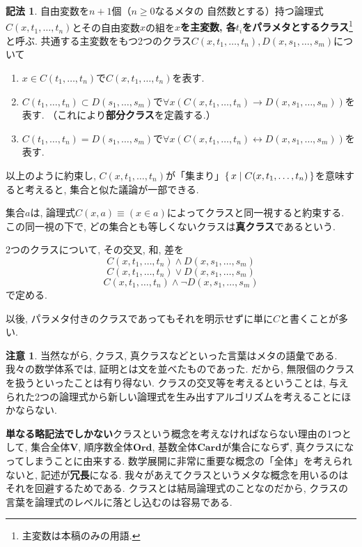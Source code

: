 \documentclass[a4paper, twoside]{bxjsarticle}
\theoremstyle{definition}
\newtheorem{rem}[thm]{注意}
\newtheorem{notation}[thm]{記法}
\begin{document}
        \begin{notation}
            自由変数を$n+1$個（$n\geq 0$なるメタの
            自然数とする）持つ論理式$C(x, t_1, \dots, t_n)$とその自由変数$x$の組を\textbf{$x$を主変数, 各$t_i$をパラメタとするクラス}\footnote{主変数は本稿のみの用語.}と呼ぶ.  共通する主変数をもつ2つのクラス$C(x, t_1, \dots, t_n), D(x, s_1, \dots, s_m)$について
            \begin{enumerate}
                \item $x \in C(t_1, \dots, t_n)$で$C(x, t_1, \dots, t_n)$を表す.
                \item $C(t_1, \dots, t_n) \subset D(s_1, \dots, s_m)$で$\forall x (C(x, t_1, \dots, t_n) \to D(x, s_1, \dots, s_m))$を表す. （これにより\textbf{部分クラス}を定義する.）
                \item $C(t_1, \dots, t_n)=D(s_1, \dots, s_m)$で$\forall x (C(x, t_1, \dots, t_n) \leftrightarrow D(x, s_1, \dots, s_m))$を表す.
            \end{enumerate}
            以上のように約束し, $C(x, t_1, \dots, t_n)$が「集まり」$\set{x|C(x, t_1, \dots, t_n)}$を意味すると考えると, 集合と似た議論が一部できる.
            
            集合$a$は, 論理式$C(x,a) \equiv (x \in a)$によってクラスと同一視すると約束する. この同一視の下で, どの集合とも等しくないクラスは\textbf{真クラス}であるという.
            
            2つのクラスについて, その交叉, 和, 差を\[C(x, t_1, \dots, t_n)\land D(x, s_1, \dots, s_m)\]\[C(x, t_1, \dots, t_n)\lor D(x, s_1, \dots, s_m)\]\[C(x, t_1, \dots, t_n)\land \lnot D(x, s_1, \dots, s_m)\]で定める.

            以後, パラメタ付きのクラスであってもそれを明示せずに単に$C$と書くことが多い.            
        \end{notation}
        \begin{rem}
            当然ながら, クラス, 真クラスなどといった言葉はメタの語彙である. 我々の数学体系では, 証明とは文を並べたものであった. だから, 無限個のクラスを扱うといったことは有り得ない. クラスの交叉等を考えるということは, 与えられた2つの論理式から新しい論理式を生み出すアルゴリズムを考えることにほかならない.
            
            \textbf{単なる略記法でしかない}クラスという概念を考えなければならない理由の1つとして, 集合全体$\textbf{V}$, 順序数全体$\textbf{Ord}$, 基数全体$\textbf{Card}$が集合にならず, 真クラスになってしまうことに由来する. 数学展開に非常に重要な概念の「全体」を考えられないと, 記述が\textbf{冗長}になる. 我々があえてクラスというメタな概念を用いるのはそれを回避するためである. クラスとは結局論理式のことなのだから, クラスの言葉を論理式のレベルに落とし込むのは容易である.
        \end{rem}
\end{document}
